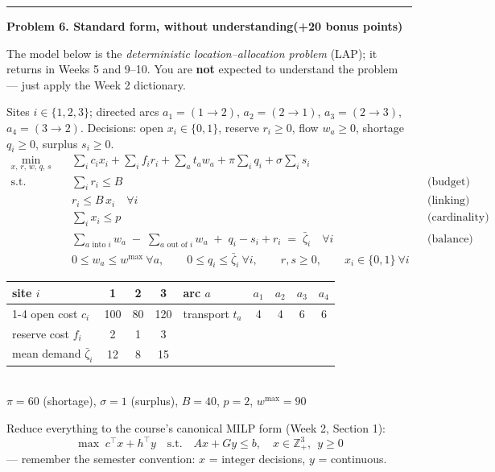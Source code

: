 \documentclass[10pt]{article}
\newcommand{\problem}[2]{%
  \par\bigskip
  {\color{ruleink}\rule{\textwidth}{1pt}}\par\nobreak\vspace{3pt}
  {\large\bfseries #2}\hfill{\normalsize\bfseries(#1 points)}\par\nobreak\vspace{4pt}}
\begin{document}
\problem{+20 bonus}{Problem 6. Standard form, without understanding}

The model below is the \emph{deterministic location--allocation problem} (LAP); it
returns in Weeks 5 and 9--10. You are \textbf{not} expected to understand the
problem --- just apply the Week 2 dictionary.

\medskip
Sites $i \in \{1,2,3\}$; directed arcs
$a_1 = (1\!\to\!2)$, $a_2 = (2\!\to\!1)$, $a_3 = (2\!\to\!3)$, $a_4 = (3\!\to\!2)$.
Decisions: open $x_i \in \{0,1\}$, reserve $r_i \ge 0$, flow $w_a \ge 0$, shortage
$q_i \ge 0$, surplus $s_i \ge 0$.
\[
\begin{aligned}
  \min_{x,\,r,\,w,\,q,\,s}\quad
    & \textstyle\sum_i c_i x_i + \sum_i f_i r_i + \sum_a t_a w_a
      + \pi \sum_i q_i + \sigma \sum_i s_i \\
  \text{s.t.}\quad
    & \textstyle\sum_i r_i \le B
      && \text{(budget)} \\
    & r_i \le B\, x_i \quad \forall i
      && \text{(linking)} \\
    & \textstyle\sum_i x_i \le p
      && \text{(cardinality)} \\
    & \textstyle\sum_{a \text{ into } i} w_a \;-\; \sum_{a \text{ out of } i} w_a
      \;+\; q_i - s_i + r_i \;=\; \bar\zeta_i \quad \forall i
      && \text{(balance)} \\
    & 0 \le w_a \le w^{\max} \ \forall a, \qquad
      0 \le q_i \le \bar\zeta_i \ \forall i, \qquad
      r, s \ge 0, \qquad x_i \in \{0,1\} \ \forall i
\end{aligned}
\]
\begin{center}
\begin{tabular}{l|ccc@{\qquad}l|cccc}
 site $i$          & 1 & 2 & 3 & arc $a$ & $a_1$ & $a_2$ & $a_3$ & $a_4$ \\ \cline{1-4}\cline{5-9}
 open cost $c_i$   & 100 & 80 & 120 & transport $t_a$ & 4 & 4 & 6 & 6 \\
 reserve cost $f_i$ & 2 & 1 & 3 & & & & & \\
 mean demand $\bar\zeta_i$ & 12 & 8 & 15 & & & & & \\
\end{tabular}\\[3pt]
$\pi = 60$ (shortage), \quad $\sigma = 1$ (surplus), \quad $B = 40$, \quad $p = 2$,
\quad $w^{\max} = 90$
\end{center}

Reduce everything to the course's canonical MILP form (Week 2, Section 1):
\[
  \max\; c^{\top}x + h^{\top}y
  \quad \text{s.t.} \quad Ax + Gy \le b,
  \quad x \in \mathbb{Z}^{3}_{+}, \ \ y \ge 0
\]
--- remember the semester convention: $x$ = integer decisions, $y$ = continuous.
\end{document}
